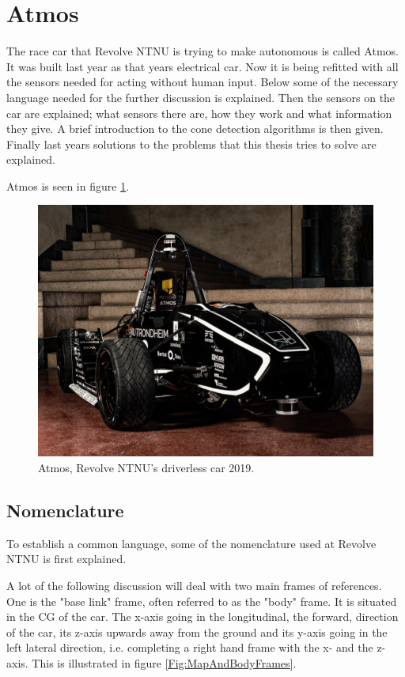 \section{Atmos}

The race car that Revolve NTNU is trying to make autonomous is called Atmos. It was built last year as that years electrical car. Now it is being refitted with all the sensors needed for acting without human input. Below some of the necessary language needed for the further discussion is explained. Then the sensors on the car are explained; what sensors there are, how they work and what information they give. A brief introduction to the cone detection algorithms is then given. Finally last years solutions to the problems that this thesis tries to solve are explained.

Atmos is seen in figure \ref{Fig:Atmos}.

\begin{figure}
    \centering
    \includegraphics[width=\linewidth]{0_Images/2_Introduction/Atmos.jpg}
    \caption[Atmos.]{Atmos, Revolve NTNU's driverless car 2019.}
    \label{Fig:Atmos}
\end{figure}

\subsection{Nomenclature}

To establish a common language, some of the nomenclature used at Revolve NTNU is first explained. 

A lot of the following discussion will deal with two main frames of references. One is the "base link" frame, often referred to as the "body" frame. It is situated in the \gls{CG} of the car. The x-axis going in the longitudinal, the forward, direction of the car, its z-axis upwards away from the ground and its y-axis going in the left lateral direction, i.e. completing a right hand frame with the x- and the z-axis. This is illustrated in figure \ref{Fig:MapAndBodyFrames}. 

